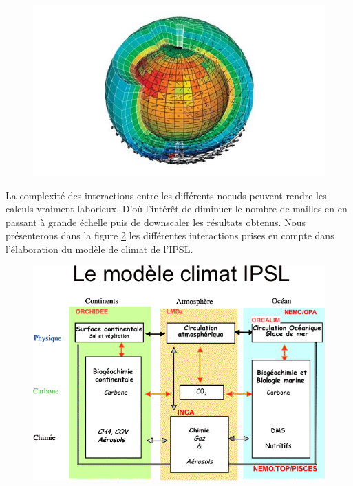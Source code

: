\documentclass[a4paper,11pt]{article}
\numberwithin{equation}{section}
\begin{document}
\begin{figure}[h]
	\begin{center}
		\includegraphics[scale=0.4]{maillage_terre.jpg}
	\end{center}
	\label{fig:maillage multidimentionnel terre}
\end{figure}

La complexité des interactions entre les différents noeuds peuvent rendre les calculs vraiment laborieux. D'où l'intérêt de diminuer le nombre de mailles en en passant à grande échelle puis de downscaler les résultats obtenus. Nous présenterons dans la figure \ref{fig:modele de climat} les différentes interactions prises en compte dans l'élaboration du modèle de climat de l'IPSL.

\begin{figure}[h]
	\begin{center}
		\includegraphics[scale=0.6]{modele_climat_IPSL.png}
	\end{center}
	\label{fig:modele de climat}
\end{figure}
	
\end{document}
